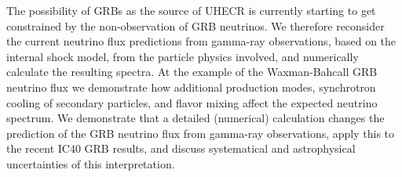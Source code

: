 


\bigskip



\bigskip

\noindent The possibility of GRBs as the source of UHECR is currently starting to get constrained by the non-observation of GRB neutrinos. We therefore reconsider the current neutrino flux predictions
from gamma-ray observations, based on the internal shock model, from the particle physics involved, and numerically calculate the resulting spectra. At the example of the Waxman-Bahcall GRB neutrino flux we demonstrate how additional production modes, synchrotron cooling of secondary particles, and flavor mixing affect the expected neutrino spectrum. We demonstrate that a detailed (numerical) calculation changes the prediction of the GRB neutrino flux from gamma-ray observations, apply this to the recent IC40 GRB results, and discuss systematical and astrophysical uncertainties of this interpretation.


